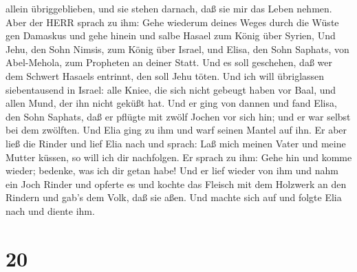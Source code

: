 allein übriggeblieben, und sie stehen darnach, daß sie mir das Leben
nehmen.  Aber der HERR sprach zu ihm: Gehe wiederum deines
Weges durch die Wüste gen Damaskus und gehe hinein und salbe Hasael zum
König über Syrien,  Und Jehu, den Sohn Nimsis, zum König
über Israel, und Elisa, den Sohn Saphats, von Abel-Mehola, zum Propheten
an deiner Statt.  Und es soll geschehen, daß wer dem
Schwert Hasaels entrinnt, den soll Jehu töten.  Und ich
will übriglassen siebentausend in Israel: alle Kniee, die sich nicht
gebeugt haben vor Baal, und allen Mund, der ihn nicht geküßt hat.
 Und er ging von dannen und fand Elisa, den Sohn Saphats,
daß er pflügte mit zwölf Jochen vor sich hin; und er war selbst bei dem
zwölften. Und Elia ging zu ihm und warf seinen Mantel auf ihn.
 Er aber ließ die Rinder und lief Elia nach und sprach: Laß
mich meinen Vater und meine Mutter küssen, so will ich dir nachfolgen.
Er sprach zu ihm: Gehe hin und komme wieder; bedenke, was ich dir getan
habe!  Und er lief wieder von ihm und nahm ein Joch Rinder
und opferte es und kochte das Fleisch mit dem Holzwerk an den Rindern
und gab's dem Volk, daß sie aßen. Und machte sich auf und folgte Elia
nach und diente ihm.

\hypertarget{section-19}{%
\section{20}\label{section-19}}

